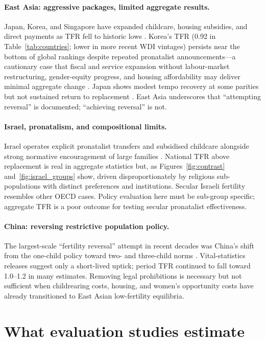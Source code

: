 \documentclass[11pt,a4paper,openany]{book}
\begin{document}
\paragraph{East Asia: aggressive packages, limited aggregate results.}
Japan, Korea, and Singapore have expanded childcare, housing subsidies, and direct payments as TFR fell to historic lows \citep{jones2019,frejkajones2010}. Korea's TFR (0.92 in Table~\ref{tab:countries}; lower in more recent WDI vintages) persists near the bottom of global rankings despite repeated pronatalist announcements---a cautionary case that fiscal and service expansion without labour-market restructuring, gender-equity progress, and housing affordability may deliver minimal aggregate change \citep{goldscheider2015,jones2019}. Japan shows modest tempo recovery at some parities but not sustained return to replacement \citep{frejka2017}. East Asia underscores that ``attempting reversal'' is documented; ``achieving reversal'' is not.

\paragraph{Israel, pronatalism, and compositional limits.}
Israel operates explicit pronatalist transfers and subsidised childcare alongside strong normative encouragement of large families \citep{okun2013}. National TFR above replacement is real in aggregate statistics but, as Figures~\ref{fig:contrast} and~\ref{fig:israel_groups} show, driven disproportionately by religious sub-populations with distinct preferences and institutions. Secular Israeli fertility resembles other OECD cases. Policy evaluation here must be sub-group specific; aggregate TFR is a poor outcome for testing secular pronatalist effectiveness.

\paragraph{China: reversing restrictive population policy.}
The largest-scale ``fertility reversal'' attempt in recent decades was China's shift from the one-child policy toward two- and three-child norms \citep{frejka2017,jones2019}. Vital-statistics releases suggest only a short-lived uptick; period TFR continued to fall toward 1.0--1.2 in many estimates. Removing legal prohibitions is necessary but not sufficient when childrearing costs, housing, and women's opportunity costs have already transitioned to East Asian low-fertility equilibria.

\section{What evaluation studies estimate}
\end{document}
